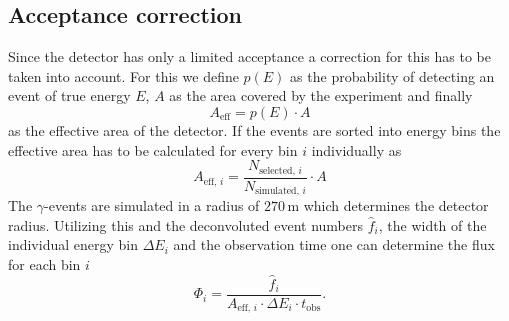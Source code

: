 \subsection{Acceptance correction}\label{subsec:flux}
Since the detector has only a limited acceptance a correction for this has to be taken into account.
For this we define $p(E)$ as the probability of detecting an event of true energy $E$, $A$ as the
area covered by the experiment and finally
\begin{equation}
    A_\text{eff} = p(E) \cdot A
\end{equation}
as the effective area of the detector. If the events are sorted into energy bins the effective area has to be calculated for
every bin $i$ individually as
\begin{equation}
    A_{\text{eff}, \, i} = \frac{N_{\text{selected}, \, i}}{N_{\text{simulated}, \, i}} \cdot A
\end{equation}
The $\gamma$-events are simulated in a radius of $270 \, \si{\metre}$ which determines the detector radius.
Utilizing this and the deconvoluted event numbers $\hat{f}_i$, the width of the individual energy bin $\Delta E_i$ and the observation time
one can determine the flux for each bin $i$
\begin{equation}
    \Phi_i = \frac{\hat{f}_i}{A_{\text{eff}, \, i} \cdot \Delta E_i \cdot t_\text{obs}}.
\end{equation}
